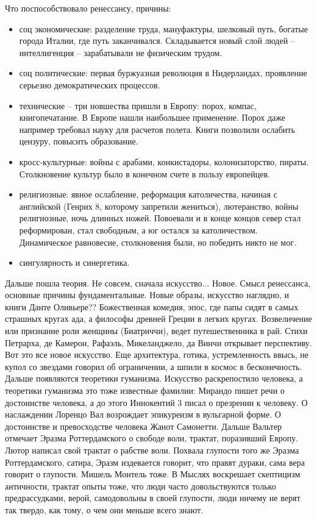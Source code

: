 \documentclass[a4paper, 12pt]{article}
\begin{document}
Что поспособствовало ренессансу, причины:
\begin{itemize}
  \item соц экономические: разделение труда, мануфактуры, шелковый путь, 
    богатые города Италии, где путь заканчивался. Складывается новый 
    слой людей -- интеллигенция -- зарабатывали не физическим трудом.
  \item соц политические: первая буржуазная революция в Нидерландах, 
    проявление серьезно демократических процессов.
  \item технические -- три новшества пришли в Европу: порох, компас, 
    книгопечатание. В Европе нашли наибольшее применение. Порох даже 
    например требовал науку для расчетов полета. Книги позволили 
    ослабить цензуру, повысить образование.
  \item кросс-культурные: войны с арабами, конкистадоры, 
    колонизаторство, пираты. Столкновение культур было в конечном счете 
    в пользу европейцев.
  \item религиозные: явное ослабление, реформация католичества, начиная 
    с английской (Генрих 8, которому запретили жениться), лютеранство, 
    войны религиозные, ночь длинных ножей. Повоевали и в конце концов 
    север стал реформирован, стал свободным, а юг остался за 
    католичеством. Динамическое равновесие, столкновения были, но 
    победить никто не мог.
  \item сингулярность и синергетика.
\end{itemize}

Дальше пошла теория. Не совсем, сначала искусство... Новое. Смысл 
ренессанса, основные причины фундаментальные. Новые образы, искусство 
наглядно, и книги Данте Оливьере?? Божественная комедия, эпос, где папы 
сидят в самых страшных кругах ада, а философы древней Греции в легких 
кругах. Возвеличение или признание роли женщины (Биатриччи), ведет 
путешественника в рай. Стихи Петрарха, де Камерон, Рафаэль, 
Микеланджело, да Винчи открывает перспективу. Вот это все новое 
искусство. Еще архитектура, готика, устремленность ввысь, не купол со 
звездами говорил об ограничении, а шпили в космос в бесконечность. 
Дальше появляются теоретики гуманизма. Искусство раскрепостило человека, 
а теоретики гуманизма это тоже известные фамилии: Мирандо пишет речи 
о достоинстве человека, а до этого Иннокентий 3 писал о презрении 
к человеку. О наслаждении Лоренцо Вал возрождает эпикуреизм в вульгарной 
форме. О достоинстве и превосходстве человека Жанот Самонетти. Дальше 
Вальтер отмечает Эразма Роттердамского о свободе воли, трактат, 
поразивший Европу. Лютор написал свой трактат о рабстве воли. Похвала 
глупости того же Эразма Роттердамского, сатира, Эразм издевается 
говорит, что правят дураки, сама вера говорит о глупости. Мишель Монтель 
тоже. В Мыслях воскрешает скептицизм античности, трактат опыты тоже, что 
люди часто довольствуются только предрассудками, верой, самодовольны 
в своей глупости, люди ничему не верят так твердо, как тому, о чем они 
меньше всего знают.
\end{document}
